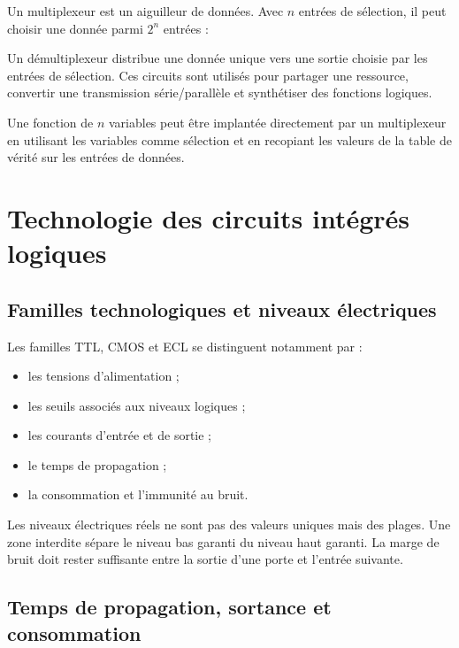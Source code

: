 Un multiplexeur est un aiguilleur de données. Avec $n$ entrées de sélection, il peut choisir une donnée parmi $2^n$ entrées :
\begin{center}\TLMuxQuatreVersUn\end{center}

Un démultiplexeur distribue une donnée unique vers une sortie choisie par les entrées de sélection. Ces circuits sont utilisés pour partager une ressource, convertir une transmission série/parallèle et synthétiser des fonctions logiques.

Une fonction de $n$ variables peut être implantée directement par un multiplexeur en utilisant les variables comme sélection et en recopiant les valeurs de la table de vérité sur les entrées de données.


\section{Technologie des circuits intégrés logiques}
\label{sec:technologie-logique}

\subsection{Familles technologiques et niveaux électriques}

Les familles TTL, CMOS et ECL se distinguent notamment par :
\begin{itemize}
  \item les tensions d'alimentation ;
  \item les seuils associés aux niveaux logiques ;
  \item les courants d'entrée et de sortie ;
  \item le temps de propagation ;
  \item la consommation et l'immunité au bruit.
\end{itemize}

Les niveaux électriques réels ne sont pas des valeurs uniques mais des plages. Une zone interdite sépare le niveau bas garanti du niveau haut garanti. La marge de bruit doit rester suffisante entre la sortie d'une porte et l'entrée suivante.


\subsection{Temps de propagation, sortance et consommation}

